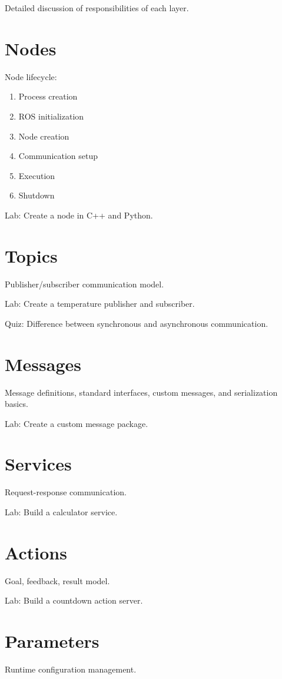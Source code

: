 \documentclass[11pt,oneside]{book}
\begin{document}
Detailed discussion of responsibilities of each layer.

\chapter{Nodes}
Node lifecycle:
\begin{enumerate}
\item Process creation
\item ROS initialization
\item Node creation
\item Communication setup
\item Execution
\item Shutdown
\end{enumerate}

Lab: Create a node in C++ and Python.

\chapter{Topics}
Publisher/subscriber communication model.

Lab:
Create a temperature publisher and subscriber.

Quiz:
Difference between synchronous and asynchronous communication.

\chapter{Messages}
Message definitions, standard interfaces,
custom messages, and serialization basics.

Lab:
Create a custom message package.

\chapter{Services}
Request-response communication.

Lab:
Build a calculator service.

\chapter{Actions}
Goal, feedback, result model.

Lab:
Build a countdown action server.

\chapter{Parameters}
Runtime configuration management.
\end{document}
